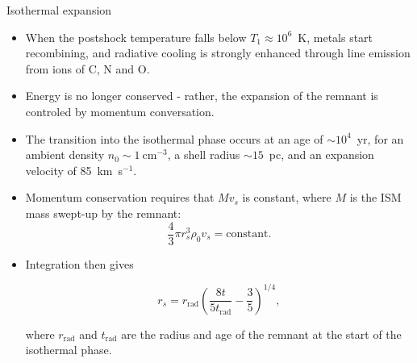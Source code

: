 \begin{frame}{Isothermal expansion}



\begin{itemize}

\item When the postshock temperature falls below $T_1 \approx 10^6$~K,
  metals start recombining, and radiative cooling is strongly enhanced
  through line emission from ions of C, N and O.

\item Energy is no longer conserved - rather, the expansion of the
  remnant is controled by momentum conversation.

\item The transition into the isothermal phase occurs at an age of
  $\sim 10^{4}$~yr, for an ambient density $n_0 \sim 1~$cm$^{-3}$, a
  shell radius $\sim 15$~pc, and an expansion velocity of
  85~km~s$^{-1}$. 
\end{itemize}

\end{frame}






\begin{frame}{}

\begin{itemize}
\item Momentum conservation requires that $M v_s$ is constant, where
  $M$ is the ISM mass swept-up by the remnant:
\[ \frac{4}{3} \pi r_s^3 \rho_0 v_s = \mathrm{constant}. \]

\item Integration then gives

\[ r_s = r_\mathrm{rad} \left( \frac{8 t }{5 t_\mathrm{rad}} -
\frac{3}{5} \right)^{1/4}, \] 

where $r_\mathrm{rad}$ and $t_\mathrm{rad}$ are the radius and age of
the remnant at the start of the isothermal phase. 

\end{itemize}

\end{frame}


